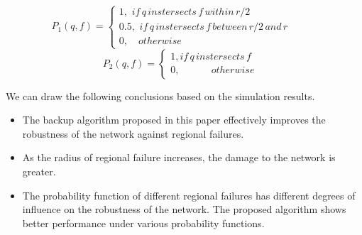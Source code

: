 \documentclass[journal]{IEEEtran}
\begin{document}
\begin{equation}
P_{1}\left ( q, f \right )=\left\{\begin{matrix}
1,\, \, if \, q \, instersects \, f\,within \, r/2 \,\,\,\,\,\,\,\,\,\,\,\,\,\,\,\,\,\,\,\, \, \,\,\,\,\,\,\,\, \,\\ 
0.5,\, \, if \, q \, instersects \, f\,between \,r/2 \, and \, r \,\,\,\,\,\,\,\,\, \, \,& \\ 
0,\, \, \, \,\, \,otherwise \,\,\,\,\,\,\,\,\,\,\, \,\,\,\,\,\,\,\,\,\,\,\,\,\,\,\,\,\,\,\,\,\,\,\,\,\,\,\,\,\,\,\,\,\,\,\,\,\,\,\,\,\,\,\,\,\,\,\,\,\,\,\,\,\,\,\,\,\,&  
\end{matrix}\right.
\end{equation}
  \begin{equation}
P_{2}\left ( q, f \right )=\left\{\begin{matrix}
1, if \, q \, instersects \, f\, & \\ 
0,  \,\,\,\,\,\,\,\,\,\,\,\,\,\,\,\,\,\,\,  otherwise & 
\end{matrix}\right.
\end{equation}
\par We can draw the following conclusions based on the simulation results.
\begin{itemize}
\item The backup algorithm proposed in this paper effectively improves the robustness of the network against regional failures.
\item As the radius of regional failure increases, the damage to the network is greater.
\item The probability function of different regional failures has different degrees of influence on the robustness of the network. The proposed algorithm shows better performance under various probability functions.

\end{itemize}
\end{document}
